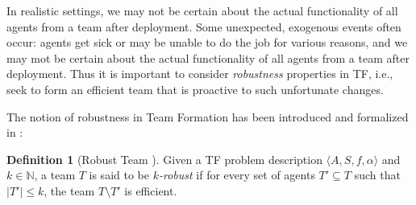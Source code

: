 \documentclass[conference]{IEEEtran}
\theoremstyle{definition}
\newtheorem{definition}{Definition}
\begin{document}
In realistic settings, we may not be certain about the actual functionality of 
all agents from a team after
deployment.
Some unexpected, exogenous events often occur:
agents get sick or may be unable to do the job for various reasons,
and we may mot be certain about the actual functionality of all agents from a team 
after
deployment. Thus it is important to consider \emph{robustness} properties in TF,
i.e., seek to form an efficient team that is proactive to such unfortunate changes.

The notion of robustness in Team Formation has been introduced and formalized in \cite{Okimoto2015}:
\begin{definition}[Robust Team \cite{Okimoto2015}]
	Given a TF problem description $\langle A, S, f, \alpha\rangle$ and  $k \in \mathbb{N}$, a team $T$
	is said to be \emph{$k$-robust} if for every set of agents $T' \subseteq T$ such that $|T'| \leq k$, the team $T \setminus T'$ is efficient.
	\label{def:TFrobust}
\end{definition}
\end{document}
